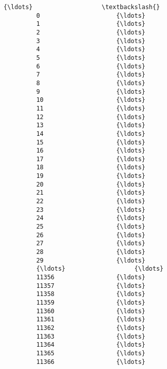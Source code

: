 \documentclass[11pt]{article}
\begin{document}
\begin{Verbatim}[commandchars=\\\{\}]
                               {\ldots}                   \textbackslash{}
         0                     {\ldots}                    
         1                     {\ldots}                    
         2                     {\ldots}                    
         3                     {\ldots}                    
         4                     {\ldots}                    
         5                     {\ldots}                    
         6                     {\ldots}                    
         7                     {\ldots}                    
         8                     {\ldots}                    
         9                     {\ldots}                    
         10                    {\ldots}                    
         11                    {\ldots}                    
         12                    {\ldots}                    
         13                    {\ldots}                    
         14                    {\ldots}                    
         15                    {\ldots}                    
         16                    {\ldots}                    
         17                    {\ldots}                    
         18                    {\ldots}                    
         19                    {\ldots}                    
         20                    {\ldots}                    
         21                    {\ldots}                    
         22                    {\ldots}                    
         23                    {\ldots}                    
         24                    {\ldots}                    
         25                    {\ldots}                    
         26                    {\ldots}                    
         27                    {\ldots}                    
         28                    {\ldots}                    
         29                    {\ldots}                    
         {\ldots}                   {\ldots}                    
         11356                 {\ldots}                    
         11357                 {\ldots}                    
         11358                 {\ldots}                    
         11359                 {\ldots}                    
         11360                 {\ldots}                    
         11361                 {\ldots}                    
         11362                 {\ldots}                    
         11363                 {\ldots}                    
         11364                 {\ldots}                    
         11365                 {\ldots}                    
         11366                 {\ldots}                    

\end{Verbatim}
\end{document}
